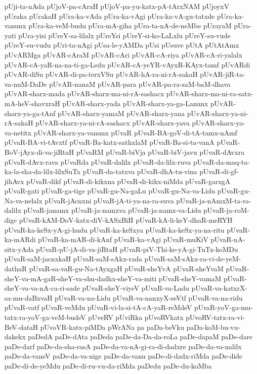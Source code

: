 {pUji-ta-nAda
pUjoV-pa-cAraH
pUjoV-pa-yu-katx-pA-tArxNAM
pUjoyxV
pUraka
pUrakaH
pUra-ka-vAda
pUra-ka-vAgi
pUra-ka-vA-gu-tatxde
pUra-ka-vanunx
pUra-ka-veM-budu
pUra-mA-giha
pUra-ta-nA-de-neMbe
pUrayaM
pUra-yati
pUra-yisi
pUreY-sa-lilalx
pUreYsi
pUreY-si-ko-LaLxlu
pUreY-su-vude
pUreY-su-vudu
pUri-ta-nAgi
pUsa-le-yAMDa
pUsi
pUsuve
pUtA
pUtAtAmx
pUvARMga
pUvAR-cAraM
pUvAR-cAri
pUvAR-cA-riya
pUvAR-cA-ri-yalalx
pUvAR-cA-yaR-na-na-ti-ga-Ledu
pUvAR-cA-yeYR-vAyxR-KAyx-tamf
pUvARdi
pUvAR-diSu
pUvAR-di-pa-terxVSu
pUvAR-hA-ra-ni-rA-sakaH
pUvAR-jiR-ta-va-nuM-DaDe
pUvAR-nanaM
pUvAR-para
pUvAR-pa-ra-saM-baM-dhava
pUvAR-sharx-mada
pUvAR-sharx-ma-ni-rA-sashacx
pUvAR-sharx-ma-ni-ra-satx-mA-heV-shavxraH
pUvAR-sharx-yada
pUvAR-sharx-ya-ga-Lanunx
pUvAR-sharx-ya-ga-tAnf
pUvAR-sharx-yamaM
pUvAR-sharx-yana
pUvAR-sharx-ya-ni-rA-sakaH
pUvAR-sharx-ya-ni-rA-sashacx
pUvAR-sharx-yava
pUvAR-sharx-ya-va-netitx
pUvAR-sharx-ya-vanunx
pUvaR
pUvaR-BA-goV-di-tA-tamx-nAmf
pUvaR-BA-vi-tAvxtf
pUvaR-Ba-katx-sathxlaM
pUvaR-Ba-si-ta-vanA
pUvaR-BoV-jAyx-di-va-jiRtaH
pUvaRM
pUvaR-biVja
pUvaR-biV-javu
pUvaR-dAvxra
pUvaR-dAvx-rava
pUvaRda
pUvaR-dalilx
pUvaR-da-lilx-ruva
pUvaR-da-maq-ta-ka-la-sha-da-lilx-lilxSuTx
pUvaR-da-tatxva
pUvaR-dhA-tu-vina
pUvaR-di-gf-jihAvx
pUvaR-dikf
pUvaR-di-kikxna
pUvaR-di-kikx-niMda
pUvaR-garxgA
pUvaR-gati
pUvaR-ga-tige
pUvaR-gu-Na-gaLu
pUvaR-gu-Na-va-Lidu
pUvaR-gu-Na-va-nelalx
pUvaR-jAcnxni
pUvaR-jA-ti-ya-na-ra-suva
pUvaR-ja-nAmxM-ta-ra-dalilx
pUvaR-janamx
pUvaR-ja-namxva
pUvaR-ja-namx-va-Lidu
pUvaR-ja-roM-dige
pUvaR-kAM-DoV-katx-diV-kASxBiH
pUvaR-kA-li-keY-dhaR-meRYH
pUvaR-ka-keSx-yA-gi-hudu
pUvaR-ka-keSxya
pUvaR-ka-keSx-ya-na-ritu
pUvaR-ka-mARdi
pUvaR-ka-mAR-di-kAnf
pUvaR-ka-vAgi
pUvaR-muKiV
pUvaR-nA-sitx-yAda
pUvaR-pU-jA-di-va-jiRtaH
pUvaR-piV-Thi-ke-yA-gi-TuTx-koMDu
pUvaR-saM-jacnxkaH
pUvaR-saM-sAkx-rada
pUvaR-saM-sAkx-ra-vi-de-yeM-dathaR
pUvaR-sa-vaR-gu-Na-tAyxgaH
pUvaR-sheYvA
pUvaR-sheYvaM
pUvaR-sheY-va-mA-gaR-sheY-va-shu-dadhx-sheY-va-miti
pUvaR-sheY-vamaM
pUvaR-sheY-va-va-nA-ca-ri-sade
pUvaR-sheY-viyeV
pUvaR-va-Ladu
pUvaR-va-katxrX-sa-mu-daBxvaH
pUvaR-va-na-Lidu
pUvaR-va-nanxyX-seVtf
pUvaR-va-na-ridu
pUvaR-vatf
pUvaR-veMdu
pUvaR-vi-la-si-tA-cA-yaR-reMdeV
pUvaR-yoV-ga-mu-tatx-ra-yoV-ga-veM-budeV
pUveRV
pUviRka
pUvoRVkatx
pUvoRV-tatx-ra-vi-BeV-dataH
pUvoVR-katx-piMDa
pWrANa
pa
paDa-beVku
paDa-koM-bu-vu-dakekx
paDedA
paDe-dAta
paDeda
paDe-da-Da-da-roLa
paDe-dapaM
paDe-dare
paDe-darf
paDe-da-sha-rasA
paDe-da-va-nA-gi-ra-di-dadxre
paDe-da-va-nalilx
paDe-da-vaneV
paDe-da-va-nige
paDe-da-vanu
paDe-di-dadx-riMda
paDe-dide
paDe-di-de-yeMdu
paDe-di-ru-vu-da-riMda
paDedu
paDe-du-koMba
}
